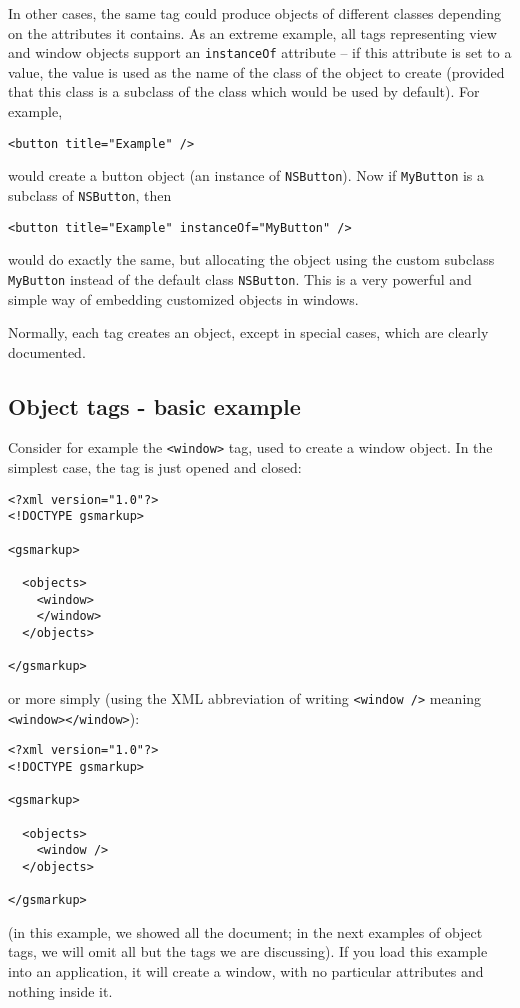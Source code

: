 In other cases, the same tag could produce objects of different
classes depending on the attributes it contains.  As an extreme
example, all tags representing view and window objects support an
\texttt{instanceOf} attribute -- if this attribute is set to a value, 
the value is used as the name of the class of the object to create
(provided that this class is a subclass of the class which would be
used by default).  For example,
\begin{verbatim}
<button title="Example" />
\end{verbatim}
would create a button object (an instance of \texttt{NSButton}).  Now
if \texttt{MyButton} is a subclass of \texttt{NSButton}, then
\begin{verbatim}
<button title="Example" instanceOf="MyButton" />
\end{verbatim}
would do exactly the same, but allocating the object using the custom
subclass \texttt{MyButton} instead of the default class
\texttt{NSButton}.  This is a very powerful and simple way of embedding 
customized objects in windows.

Normally, each tag creates an object, except in special cases, which
are clearly documented.

\subsection{Object tags - basic example}
Consider for example the \texttt{<window>} tag, used to create a
window object.  In the simplest case, the tag is just opened and
closed:
\begin{verbatim}
<?xml version="1.0"?>
<!DOCTYPE gsmarkup>

<gsmarkup>

  <objects>
    <window>
    </window>
  </objects>

</gsmarkup>
\end{verbatim}
or more simply (using the XML abbreviation of writing
\texttt{<window />} meaning \texttt{<window></window>}):
\begin{verbatim}
<?xml version="1.0"?> 
<!DOCTYPE gsmarkup>

<gsmarkup>

  <objects>
    <window />
  </objects>

</gsmarkup>
\end{verbatim}
(in this example, we showed all the document; in the next examples of
object tags, we will omit all but the tags we are discussing).  If you
load this example into an application, it will create a window, with
no particular attributes and nothing inside it.

